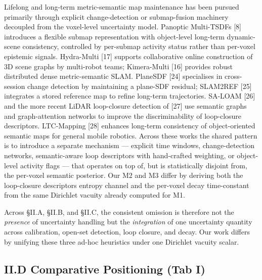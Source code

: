 \documentclass[
]{article}
\begin{document}
Lifelong and long-term metric-semantic map maintenance has been pursued
primarily through explicit change-detection or submap-fusion machinery
decoupled from the voxel-level uncertainty model. Panoptic Multi-TSDFs
{[}8{]} introduces a flexible submap representation with object-level
long-term dynamic-scene consistency, controlled by per-submap activity
status rather than per-voxel epistemic signals. Hydra-Multi {[}17{]}
supports collaborative online construction of 3D scene graphs by
multi-robot teams; Kimera-Multi {[}16{]} provides robust distributed
dense metric-semantic SLAM. PlaneSDF {[}24{]} specialises in
cross-session change detection by maintaining a plane-SDF residual;
SLAM2REF {[}25{]} integrates a stored reference map to refine long-term
trajectories. SA-LOAM {[}26{]} and the more recent LiDAR loop-closure
detection of {[}27{]} use semantic graphs and graph-attention networks
to improve the discriminability of loop-closure descriptors. LTC-Mapping
{[}28{]} enhances long-term consistency of object-oriented semantic maps
for general mobile robotics. Across these works the shared pattern is to
introduce a separate mechanism --- explicit time windows,
change-detection networks, semantic-aware loop descriptors with
hand-crafted weighting, or object-level activity flags --- that operates
on top of, but is statistically disjoint from, the per-voxel semantic
posterior. Our M2 and M3 differ by deriving both the loop-closure
descriptor\textquotesingle s entropy channel and the per-voxel decay
time-constant from the same Dirichlet vacuity already computed for M1.

Across §II.A, §II.B, and §II.C, the consistent omission is therefore not
the \emph{presence} of uncertainty handling but the \emph{integration}
of one uncertainty quantity across calibration, open-set detection, loop
closure, and decay. Our work differs by unifying these three ad-hoc
heuristics under one Dirichlet vacuity scalar.

\subsection{II.D Comparative Positioning (Tab
I)}\label{iid-comparative-positioning-tab-i}
\end{document}

